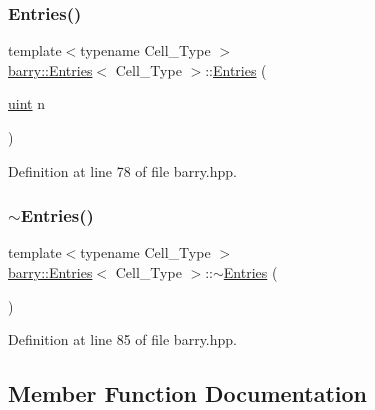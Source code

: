 \subsubsection{\texorpdfstring{Entries()}{Entries()}\hspace{0.1cm}{\footnotesize\ttfamily [2/2]}}
{\footnotesize\ttfamily template$<$typename Cell\+\_\+\+Type $>$ \\
\hyperlink{classbarry_1_1_entries}{barry\+::\+Entries}$<$ Cell\+\_\+\+Type $>$\+::\hyperlink{classbarry_1_1_entries}{Entries} (\begin{DoxyParamCaption}\item[{\hyperlink{namespacebarry_a11dfc53ddb4672278319aa04f1e09a6c}{uint}}]{n }\end{DoxyParamCaption})\hspace{0.3cm}{\ttfamily [inline]}}



Definition at line 78 of file barry.\+hpp.

\mbox{\label{classbarry_1_1_entries_a8d74af4d3b545fb79f9f4e8e894160cb}} 
\subsubsection{\texorpdfstring{$\sim$\+Entries()}{~Entries()}}
{\footnotesize\ttfamily template$<$typename Cell\+\_\+\+Type $>$ \\
\hyperlink{classbarry_1_1_entries}{barry\+::\+Entries}$<$ Cell\+\_\+\+Type $>$\+::$\sim$\hyperlink{classbarry_1_1_entries}{Entries} (\begin{DoxyParamCaption}{ }\end{DoxyParamCaption})\hspace{0.3cm}{\ttfamily [inline]}}



Definition at line 85 of file barry.\+hpp.



\subsection{Member Function Documentation}
\mbox{\label{classbarry_1_1_entries_a0c1e6fb0a6e2c462ba782433ac11e026}} 
